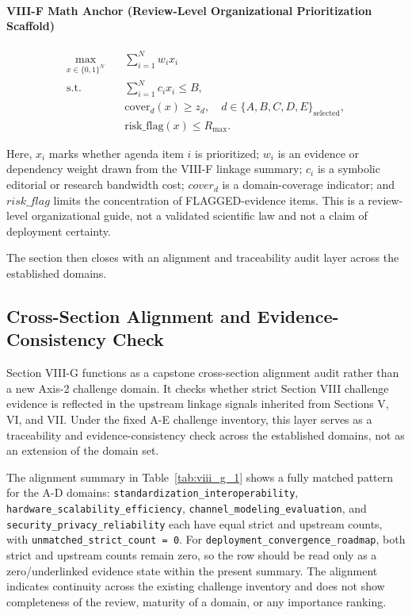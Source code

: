\documentclass[lettersize,journal]{IEEEtran}
\begin{document}
\paragraph{VIII-F Math Anchor (Review-Level Organizational Prioritization Scaffold)}

\begin{equation}
\begin{aligned}
\max_{x \in \{0,1\}^N}\quad & \sum_{i=1}^{N} w_i x_i \\
\text{s.t.}\quad & \sum_{i=1}^{N} c_i x_i \le B,\\
& \mathrm{cover}_d(x) \ge z_d,\quad d \in \{A,B,C,D,E\}_{\mathrm{selected}},\\
& \mathrm{risk\_flag}(x) \le R_{\max}.
\end{aligned}
\end{equation}

Here, $x_i$ marks whether agenda item $i$ is prioritized; $w_i$ is an evidence or dependency weight drawn from the VIII-F linkage summary; $c_i$ is a symbolic editorial or research bandwidth cost; $cover_d$ is a domain-coverage indicator; and $risk\_flag$ limits the concentration of FLAGGED-evidence items. This is a review-level organizational guide, not a validated scientific law and not a claim of deployment certainty.

The section then closes with an alignment and traceability audit layer across the established domains.

\subsection{Cross-Section Alignment and Evidence-Consistency Check}

Section VIII-G functions as a capstone cross-section alignment audit rather than a new Axis-2 challenge domain. It checks whether strict Section VIII challenge evidence is reflected in the upstream linkage signals inherited from Sections V, VI, and VII. Under the fixed A-E challenge inventory, this layer serves as a traceability and evidence-consistency check across the established domains, not as an extension of the domain set.

The alignment summary in Table~\ref{tab:viii_g_1} shows a fully matched pattern for the A-D domains: \texttt{standardization\_interoperability}, \texttt{hardware\_scalability\_efficiency}, \texttt{channel\_modeling\_evaluation}, and \texttt{security\_privacy\_reliability} each have equal strict and upstream counts, with \texttt{unmatched\_strict\_count = 0}. For \texttt{deployment\_convergence\_roadmap}, both strict and upstream counts remain zero, so the row should be read only as a zero/underlinked evidence state within the present summary. The alignment indicates continuity across the existing challenge inventory and does not show completeness of the review, maturity of a domain, or any importance ranking.
\end{document}
